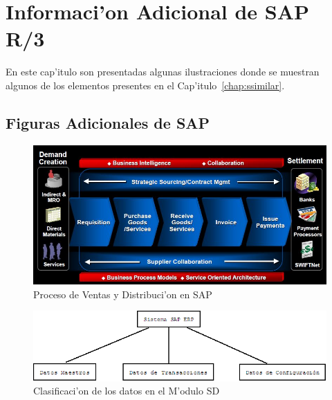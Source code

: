 \chapter{Informaci'on Adicional de SAP R/3}

	En este cap'itulo son presentadas algunas ilustraciones donde se muestran algunos de los elementos presentes en el Cap'itulo~\ref{chap:ssimilar}.

\section{Figuras Adicionales de SAP}
\begin{figure}[H]
\centering
\includegraphics[scale=1.0,type=jpg,ext=.jpg,read=.jpg]{figures/salesFlow}
\caption{Proceso de Ventas y Distribuci'on en SAP}
\label{fig:salesFlow}
\end{figure}

\begin{figure}[htb]
\centering
\includegraphics[scale=0.45,type=png,ext=.png,read=.png]{figures/Clasificacion1}
\caption{Clasificaci'on de los datos en el M'odulo SD}
\label{fig:datasd}
\end{figure}

